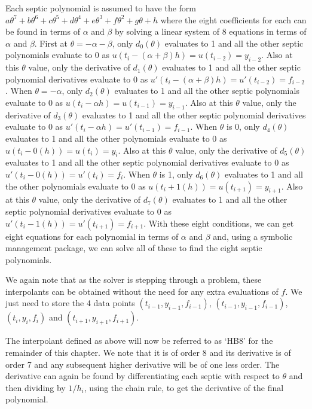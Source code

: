 \documentclass{article}
\begin{document}
Each septic polynomial is assumed to have the form $a\theta^7 + b\theta^6 + c\theta^5 + d\theta^4 + e\theta^3 + f\theta^2 + g\theta + h$ where the eight coefficients for each can be found in terms of $\alpha$ and $\beta$ by solving a linear system of 8 equations in terms of $\alpha$ and $\beta$. First at $\theta = -\alpha-\beta$, only $d_0(\theta)$ evaluates to 1 and all the other septic polynomials evaluate to 0 as $u(t_i - (\alpha+\beta) h) = u(t_{i - 2}) = y_{i - 2}$. Also at this $\theta$ value, only the derivative of $d_1(\theta)$ evaluates to 1 and all the other septic polynomial derivatives evaluate to 0 as $u'(t_i - (\alpha+\beta) h) = u'(t_{i - 2}) = f_{i - 2}$. When $\theta = -\alpha$, only $d_2(\theta)$ evaluates to 1 and all the other septic polynomials evaluate to 0 as $u(t_i - \alpha h) = u(t_{i - 1}) = y_{i - 1}$. Also at this $\theta$ value, only the derivative of $d_3(\theta)$ evaluates to 1 and all the other septic polynomial derivatives evaluate to 0 as $u'(t_i - \alpha h) = u'(t_{i - 1}) = f_{i - 1}$. When $\theta$ is 0, only $d_4(\theta)$ evaluates to 1 and all the other polynomials evaluate to 0 as $u(t_i - 0(h)) = u(t_i) = y_i$. Also at this $\theta$ value, only the derivative of $d_5(\theta)$ evaluates to 1 and all the other septic polynomial derivatives evaluate to 0 as $u'(t_i - 0(h)) = u'(t_i) = f_i$. When $\theta$ is 1, only $d_6(\theta)$ evaluates to 1 and all the other polynomials evaluate to 0 as $u(t_i + 1(h)) = u(t_{i+1}) = y_{i+1}$. Also at this $\theta$ value, only the derivative of $d_7(\theta)$ evaluates to 1 and all the other septic polynomial derivatives evaluate to 0 as $u'(t_i - 1(h)) = u'(t_{i+1}) = f_{i+1}$. With these eight conditions, we can get eight equations for each polynomial in terms of $\alpha$ and $\beta$ and, using a symbolic management package, we can solve all of these to find the eight septic polynomials.

We again note that as the solver is stepping through a problem, these interpolants can be obtained without the need for any extra evaluations of $f$. We just need to store the 4 data points $(t_{i-1}, y_{i - 1}, f_{i - 1})$, $(t_{i-1}, y_{i - 1}, f_{i - 1})$, $(t_i, y_i, f_i)$ and $(t_{i + 1}, y_{i + 1}, f_{i + 1})$.

The interpolant defined as above will now be referred to as `HB8' for the remainder of this chapter. We note that it is of order 8 and its derivative is of order 7 and any subsequent higher derivative will be of one less order. The derivative can again be found by differentiating each septic with respect to $\theta$ and then dividing by $1/h_i$, using the chain rule, to get the derivative of the final polynomial.
\end{document}
